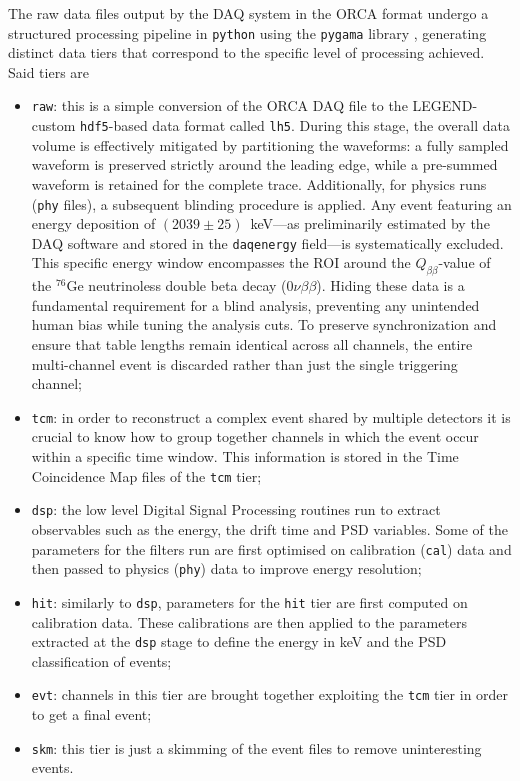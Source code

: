 The raw data files output by the DAQ system in the ORCA format undergo a structured processing pipeline in \texttt{python} using the \texttt{pygama} library \cite{pygama}, generating distinct data tiers that correspond to the specific level of processing achieved. Said tiers are 
\begin{itemize}
    \item \texttt{raw}: this is a simple conversion of the ORCA DAQ file to the LEGEND-custom \texttt{hdf5}-based data format called \texttt{lh5}. 
    During this stage, the overall data volume is effectively mitigated by partitioning the waveforms: a fully sampled waveform is preserved strictly around the leading edge, while a pre-summed waveform is retained for the complete trace. 
    Additionally, for physics runs (\texttt{phy} files), a subsequent blinding procedure is applied. Any event featuring an energy deposition of $(2039 \pm 25)$~keV---as preliminarily estimated by the DAQ software and stored in the \texttt{daqenergy} field---is systematically excluded. This specific energy window encompasses the \ac{ROI} around the $Q_{\beta\beta}$-value of the $^{76}\mathrm{Ge}$ neutrinoless double beta decay ($0\nu\beta\beta$). Hiding these data is a fundamental requirement for a blind analysis, preventing any unintended human bias while tuning the analysis cuts. To preserve synchronization and ensure that table lengths remain identical across all channels, the entire multi-channel event is discarded rather than just the single triggering channel;
    \item \texttt{tcm}: in order to reconstruct a complex event shared by multiple detectors it is crucial to know how to group together channels in which the event occur within a specific time window. This information is stored in the Time Coincidence Map files of the \texttt{tcm} tier;
    \item \texttt{dsp}: the low level Digital Signal Processing routines run to extract observables such as the energy, the drift time and \ac{PSD} variables. Some of the parameters for the filters run are first optimised on calibration (\texttt{cal}) data and then passed to physics (\texttt{phy}) data to improve energy resolution;
    \item \texttt{hit}: similarly to \texttt{dsp}, parameters for the \texttt{hit} tier are first computed on calibration data. These calibrations are then applied to the parameters extracted at the \texttt{dsp} stage to define the energy in keV and the PSD classification of events;
    \item \texttt{evt}: channels in this tier are brought together exploiting the \texttt{tcm} tier in order to get a final event;
    \item \texttt{skm}: this tier is just a skimming of the event files to remove uninteresting events.
\end{itemize} 
